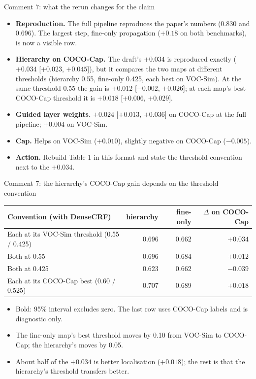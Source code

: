 \begin{frame}{Comment 7: what the rerun changes for the claim}
\begin{itemize}
  \item \textbf{Reproduction.} The full pipeline reproduces the paper's numbers (0.830 and 0.696). The largest step, fine-only propagation ($+0.18$ on both benchmarks), is now a visible row.
  \item \textbf{Hierarchy on COCO-Cap.} The draft's $+0.034$ is reproduced exactly ($+0.034$ [$+0.023$, $+0.045$]), but it compares the two maps at different thresholds (hierarchy 0.55, fine-only 0.425, each best on VOC-Sim). At the same threshold 0.55 the gain is $+0.012$ [$-0.002$, $+0.026$]; at each map's best COCO-Cap threshold it is $+0.018$ [$+0.006$, $+0.029$].
  \item \textbf{Guided layer weights.} $+0.024$ [$+0.013$, $+0.036$] on COCO-Cap at the full pipeline; $+0.004$ on VOC-Sim.
  \item \textbf{Cap.} Helps on VOC-Sim ($+0.010$), slightly negative on COCO-Cap ($-0.005$).
  \item \textbf{Action.} Rebuild Table 1 in this format and state the threshold convention next to the $+0.034$.
\end{itemize}
\end{frame}

\begin{frame}{Comment 7: the hierarchy's COCO-Cap gain depends on the threshold convention}
\begin{slidetable}
\begin{tabular}{lrrr}
\toprule
Convention (with DenseCRF) & hierarchy & fine-only & $\Delta$ on COCO-Cap \\
\midrule
Each at its VOC-Sim threshold (0.55 / 0.425) & 0.696 & 0.662 & $\mathbf{+0.034}$ \\
Both at 0.55                                 & 0.696 & 0.684 & $+0.012$ \\
Both at 0.425                                & 0.623 & 0.662 & $\mathbf{-0.039}$ \\
Each at its COCO-Cap best (0.60 / 0.525)     & 0.707 & 0.689 & $\mathbf{+0.018}$ \\
\bottomrule
\end{tabular}
\end{slidetable}
\begin{itemize}
  \item Bold: 95\% interval excludes zero. The last row uses COCO-Cap labels and is diagnostic only.
  \item The fine-only map's best threshold moves by 0.10 from VOC-Sim to COCO-Cap; the hierarchy's moves by 0.05.
  \item About half of the $+0.034$ is better localisation ($+0.018$); the rest is that the hierarchy's threshold transfers better.
\end{itemize}
\end{frame}
